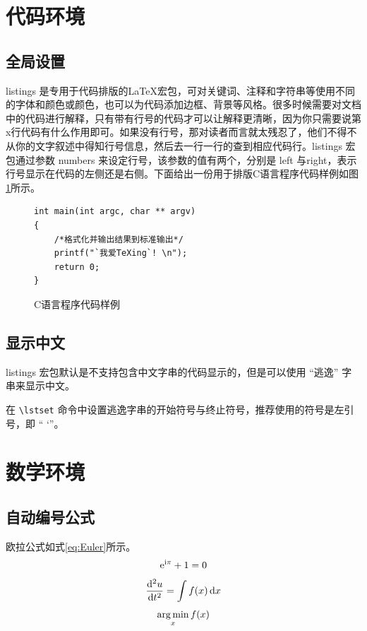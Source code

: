 \section{代码环境}

\subsection{全局设置}
listings 是专用于代码排版的\LaTeX{}宏包，可对关键词、注释和字符串等使用不同的字体和颜色或颜色，也可以为代码添加边框、背景等风格。很多时候需要对文档中的代码进行解释，只有带有行号的代码才可以让解释更清晰，因为你只需要说第 x行代码有什么作用即可。如果没有行号，那对读者而言就太残忍了，他们不得不从你的文字叙述中得知行号信息，然后去一行一行的查到相应代码行。listings 宏包通过参数 numbers 来设定行号，该参数的值有两个，分别是 left 与right，表示行号显示在代码的左侧还是右侧。下面给出一份用于排版C语言程序代码样例如图\ref{fig:code}所示。
\begin{figure}[htb!]
	\centering
	\begin{lstlisting}[language={[ANSI]C}] 
int main(int argc, char ** argv) 
{ 
    /*格式化并输出结果到标准输出*/
    printf("`我爱TeXing`! \n"); 
    return 0; 
} 
	\end{lstlisting} 
	\caption{C语言程序代码样例}
	\label{fig:code}
\end{figure}

\subsection{显示中文}
listings 宏包默认是不支持包含中文字串的代码显示的，但是可以使用 “逃逸” 字串来显示中文。

在 \verb|\lstset| 命令中设置逃逸字串的开始符号与终止符号，推荐使用的符号是左引号，即 “ `”。

\section{数学环境}

\subsection{自动编号公式}
欧拉公式如式\ref{eq:Euler}所示。
\begin{equation}\label{eq:Euler}
\mathrm{e}^{\mathrm{i}\pi} + 1 = 0
\end{equation}
\begin{equation}
\frac{\mathop{}\!\mathrm{d}^2u}{\mathop{}\!\mathrm{d} t^2} = \int f(x) \mathop{}\!\mathrm{d} x
\end{equation}
\begin{equation}
\operatorname*{arg\,min}_x f(x)
\end{equation}

